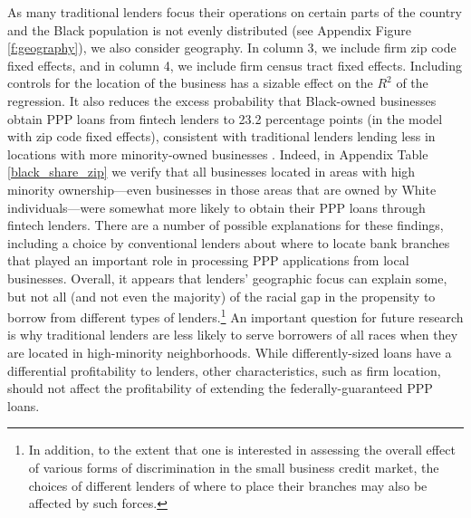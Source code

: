 \documentclass[11pt]{article}
\begin{document}
As many traditional lenders focus their operations on certain parts of the country and the Black population is not evenly distributed (see Appendix Figure \ref{f:geography}), we also consider geography. In column 3, we include firm zip code fixed effects, and in column 4, we include firm census tract fixed effects. Including controls for the location of the business has a sizable effect on the $R^2$ of the regression. It also reduces the excess probability that Black-owned businesses obtain PPP loans from fintech lenders to 23.2 percentage points (in the model with zip code fixed effects), consistent with traditional lenders lending less in locations with more minority-owned businesses \citep[see][]{erel2020does}. Indeed, in Appendix Table \ref{black_share_zip} we verify that all businesses located in areas with high minority ownership---even businesses in those areas that are owned by White individuals---were somewhat more likely to obtain their PPP loans through fintech lenders. There are a number of possible explanations for these findings, including a choice by conventional lenders about where to locate bank branches that played an important role in processing PPP applications from local businesses. Overall, it appears that lenders' geographic focus can explain some, but not all (and not even the majority) of the racial gap in the propensity to borrow from different types of lenders.\footnote{In addition, to the extent that one is interested in assessing the overall effect of various forms of discrimination in the small business credit market, the choices of different lenders of where to place their branches may also be affected by such forces.} An important question for future research is why traditional lenders are less likely to serve borrowers of all races when they are located in high-minority neighborhoods. While differently-sized loans have a differential profitability to lenders, other characteristics, such as firm location, should not affect the profitability of extending the federally-guaranteed PPP loans. 
\end{document}
